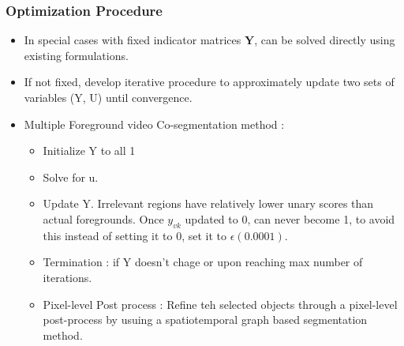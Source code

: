 \documentclass{article}
\begin{document}
\subsubsection{Optimization Procedure}
\begin{itemize}
\item In special cases with fixed indicator matrices $\textbf{Y}$, can be solved directly using existing formulations.
\item If not fixed, develop iterative procedure to approximately update two sets of variables (Y, U) until convergence.
\item Multiple Foreground video Co-segmentation method :
  \begin{itemize}
  \item Initialize Y to all 1
  \item Solve for u.
  \item Update Y. Irrelevant regions have relatively lower unary scores than actual foregrounds. Once $y_{vk}$ updated to 0, can never become 1, to avoid this instead of setting it to 0, set it to $\epsilon (0.0001)$.
  \item Termination : if Y doesn't chage or upon reaching max number of iterations.
  \item Pixel-level Post process : Refine teh selected objects through a pixel-level post-process by usuing a spatiotemporal graph based segmentation method.
  \end{itemize}
\end{itemize}





\end{document}
